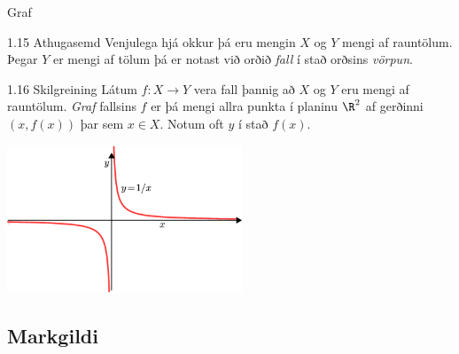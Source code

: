 \documentclass[icelandic,a4paper,12pt]{article}
\begin{document}
\begin{frame}{Graf}
\begin{block}{1.15 Athugasemd}
 Venjulega hjá okkur þá eru mengin $X$ og $Y$ mengi af rauntölum. Þegar $Y$ er
mengi af tölum þá er notast við orðið \emph{fall} í stað orðsins 
\emph{vörpun}.
\end{block}

\pause

\begin{block}{1.16 Skilgreining}
Látum $f:X \to Y$ vera fall þannig að $X$ og $Y$ eru mengi 
af rauntölum. \emph{Graf} fallsins $f$ er þá mengi allra punkta í planinu
$\R^2$ af gerðinni $(x,f(x))$ þar sem $x\in X$. 
Notum oft $y$ í stað $f(x)$.
\end{block}

\begin{center}
\includegraphics[width=7cm,keepaspectratio=true]{./myndir/kafli01/02_Graf.png}
\end{center}

\end{frame}

\subsection*{Markgildi}
\end{document}
